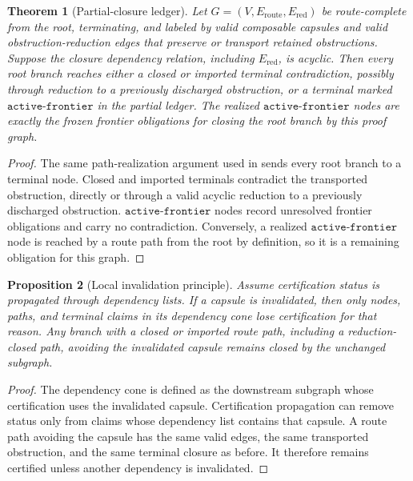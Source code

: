 \documentclass[11pt]{article}
\theoremstyle{plain}
\newtheorem{theorem}{Theorem}[section]
\newtheorem{proposition}[theorem]{Proposition}
\theoremstyle{definition}
\theoremstyle{remark}
\begin{document}
\begin{theorem}[Partial-closure ledger]
\label{thm:partial-closure-ledger}
Let \(G=(V,E_{\mathrm{route}},E_{\mathrm{red}})\) be route-complete from the
root, terminating, and labeled by valid composable capsules and valid
obstruction-reduction edges that preserve or transport retained obstructions.
Suppose the closure dependency relation, including \(E_{\mathrm{red}}\), is
acyclic.  Then every root branch reaches either a closed or imported terminal
contradiction, possibly through reduction to a previously discharged
obstruction, or a terminal marked \(\texttt{active-frontier}\) in the partial
ledger.  The realized \(\texttt{active-frontier}\) nodes are exactly the frozen
frontier obligations for closing the root branch by this proof graph.
\end{theorem}

\begin{proof}
The same path-realization argument used in
 sends every root branch to a terminal node.
Closed and imported terminals contradict the transported obstruction, directly
or through a valid acyclic reduction to a previously discharged obstruction.
\(\texttt{active-frontier}\) nodes record unresolved frontier obligations and carry no
contradiction.  Conversely, a realized \(\texttt{active-frontier}\) node is reached by a route
path from the root by definition, so it is a remaining obligation for this
graph.
\end{proof}

\begin{proposition}[Local invalidation principle]
\label{prop:local-invalidation}
Assume certification status is propagated through dependency lists.  If a
capsule is invalidated, then only nodes, paths, and terminal claims in its
dependency cone lose certification for that reason.  Any branch with a closed
or imported route path, including a reduction-closed path, avoiding the
invalidated capsule remains closed by the unchanged subgraph.
\end{proposition}

\begin{proof}
The dependency cone is defined as the downstream subgraph whose certification
uses the invalidated capsule.  Certification propagation can remove status only
from claims whose dependency list contains that capsule.  A route path
avoiding the capsule has the same valid edges, the same transported
obstruction, and the same terminal closure as before.  It therefore remains
certified unless another dependency is invalidated.
\end{proof}
\end{document}
